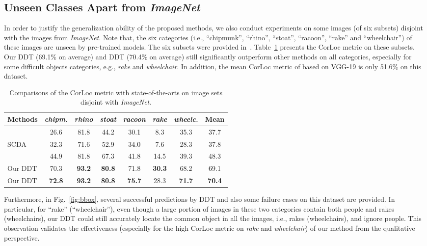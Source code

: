 \documentclass[twocolumn]{svjour3}          \smartqed  \usepackage{graphicx}
\begin{document}
\subsection{Unseen Classes Apart from \emph{ImageNet}}\label{sec:unseen}

In order to justify the generalization ability of the proposed methods, we also conduct experiments on some images (of six subsets) disjoint with the images from \emph{ImageNet}. Note that, the six categories (i.e., ``chipmunk'', ``rhino'', ``stoat'', ``racoon'', ``rake'' and ``wheelchair'') of these images are unseen by pre-trained models. The six subsets were provided in~\citep{yaoeccv2016}. Table~\ref{table:unseen} presents the CorLoc metric on these subsets. Our DDT (69.1\% on average) and DDT (70.4\% on average) still significantly outperform other methods on all categories, especially for some difficult objects categories, e.g., \emph{rake} and \emph{wheelchair}. In addition, the mean CorLoc metric of \citep{yaoeccv2016} based on VGG-19 is only 51.6\% on this dataset.

\begin{table}[t!]
 \caption{Comparisons of the CorLoc metric with state-of-the-arts on image sets disjoint with \emph{ImageNet}.} \label{table:unseen}
 \centering
\setlength{\tabcolsep}{0pt}
 \begin{tabular}{l||c|c|c|c|c|c||c}
  \hline
  {Methods}  & {\emph{chipm.}} & {\emph{rhino}} & {\emph{stoat}} & {\emph{racoon}} & \emph{rake} & \emph{wheelc.} & \textbf{Mean} \\  
  \hline
  \citet{chicvpr2015}  & 26.6 & 81.8 & 44.2 & 30.1 & 8.3 & 35.3& 37.7 \\
  SCDA & 32.3  & 	71.6  & 	52.9  & 	34.0 	 & 7.6  & 	28.3 	 & 37.8 \\
  \citet{yaoeccv2016} & 44.9 & 81.8& 67.3& 41.8& 14.5& 39.3  & 48.3\\
  \hline
  Our DDT & {70.3}  & 	\textbf{93.2}  & 	\textbf{80.8} 	 & {71.8}  & 	\textbf{30.3}  & 	{68.2} & 	{69.1} \\
  Our DDT & \textbf{72.8}  & 	\textbf{93.2}  & 	\textbf{80.8} 	 & \textbf{75.7}  & 	{28.3}  & 	\textbf{71.7} & 	\textbf{70.4} \\
  \hline
 \end{tabular}
\end{table}

Furthermore, in Fig.~\ref{fig:bbox}, several successful predictions by DDT and also some failure cases on this dataset are provided. In particular, for ``rake'' (``wheelchair''), even though a large portion of images in these two categories contain both people and rakes (wheelchairs), our DDT could still accurately locate the common object in all the images, i.e., rakes (wheelchairs), and ignore people. This observation validates the effectiveness (especially for the high CorLoc metric on \emph{rake} and \emph{wheelchair}) of our method from the qualitative perspective.
\end{document}
